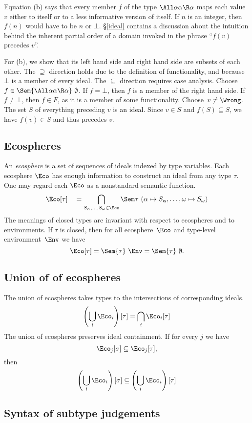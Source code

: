 \documentclass{amsart}
\theoremstyle{definition}
\begin{document}
Equation (b) says that every member $f$ of the type
$\All\alpha\alpha\R\alpha$ maps each value~$v$ either to itself
or to a less informative version of itself. If $n$ is an integer,
then $f(n)$ would have to be $n$ or $\bot$. \S\ref{ideal}
contains a discussion about the intuition behind the inherent
partial order of a domain invoked in the phrase ``$f(v)$ precedes
$v$''.

For (b), we show that its left hand side and right hand side are
subsets of each other. The $\supseteq$ direction holds due to the
definition of functionality, and because $\bot$ is a member of
every ideal. The $\subseteq$ direction requires case analysis.
Choose $f\in\Sem{\All\alpha\alpha\R\alpha}~\emptyset$. If
$f=\bot$, then $f$ is a member of the right hand side. If
$f\neq\bot$, then $f\in F$, as it is a member of some
functionality. Choose~$v\neq\Wrong$. The set $S$ of everything
preceding $v$ is an ideal. Since $v\in S$ and
$f(S)\subseteq S$, we have $f(v)\in S$ and thus precedes $v$.

\subsection{Ecospheres}

An \emph{ecosphere} is a set of sequences of ideals indexed by
type variables. Each ecosphere $\Eco$ has enough information to
construct an ideal from any type $\tau$. One may regard each
$\Eco$ as a nonstandard semantic function.
\[
\Eco[\tau] \quad =
\bigcap_{S_\alpha,\ldots,S_\omega\in \Eco}
\Sem\tau~(\alpha\mapsto S_\alpha,\ldots,\omega\mapsto S_\omega)
\]
The meanings of closed types are invariant with respect to
ecospheres and to environments. If $\tau$ is closed, then for all
ecosphere~$\Eco$ and type-level environment~$\Env$ we have
\[
\Eco[\tau] = \Sem{\tau}~\Env = \Sem{\tau}~\emptyset.
\]

\subsection{Union of of ecospheres}
The union of ecospheres takes types to the intersections of
corresponding ideals.
\[
\left(\bigcup_i\Eco_i\right)[\tau]
=
\bigcap_i\Eco_i[\tau]
\]
The union of ecospheres preserves ideal containment. If for every
$j$ we have
\[
\Eco_j[\sigma]\subseteq\Eco_j[\tau],
\]
then
\[
\left(\bigcup_i\Eco_i\right)[\sigma]
\subseteq
\left(\bigcup_i\Eco_i\right)[\tau]
\]

\subsection{Syntax of subtype judgements}
\end{document}
